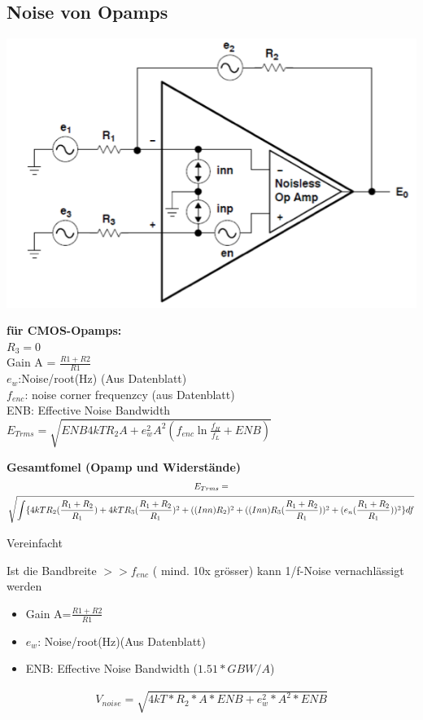 \subsection{Noise von Opamps}
\begin{multicols}{2}
	\includegraphics[scale=0.4]{pictures/oampnoise}
	\columnbreak
	
	\textbf{für CMOS-Opamps:} \\
	$R_3=0$ \\
	Gain A = $\frac{R1+R2}{R1}$ \\
	$e_{w}$:Noise/root(Hz) (Aus Datenblatt) \\
	$f_{enc}$: noise corner frequenzcy (aus Datenblatt) \\
	ENB: Effective Noise Bandwidth \\
	$E_{Trms}=\sqrt{ENB4kTR_{2}A+e_{w}^2A^2(f_{enc}\ln{\frac{f_{H}}{f_{L}}}+ENB)}$
\end{multicols}

\textbf{Gesamtfomel (Opamp und Widerstände)}\\
\begin{gather*}
E_{Trms}=\notag\\\sqrt{\int
\{4kTR_{2}(\frac{R_{1}+R_{2}}{R_{1}})+4kTR_{3}(\frac{R_{1}+R_{2}}{R_{1}})^2+((Inn)R_{2})^2+((Inn)R_{3}(\frac{R_{1}+R_{2}}{R_{1}}))^2+(e_{n}(\frac{R_{1}+R_{2}}{R_{1}}))^2\}df}
\end{gather*}


Vereinfacht 


Ist die Bandbreite $>>f_{enc}$ ( mind. 10x grösser) kann 1/f-Noise
vernachlässigt werden
\begin{itemize}
  \item Gain A=$\frac{R1+R2}{R1}$
  \item $e_{w}$: Noise/root(Hz)(Aus Datenblatt)
  \item ENB: Effective Noise Bandwidth ($1.51*GBW/A$)
\end{itemize}
\begin{gather*}
V_{noise}=\sqrt{4kT*R_{2}*A*ENB+e_{w}^2*A^2*ENB}
\end{gather*}
